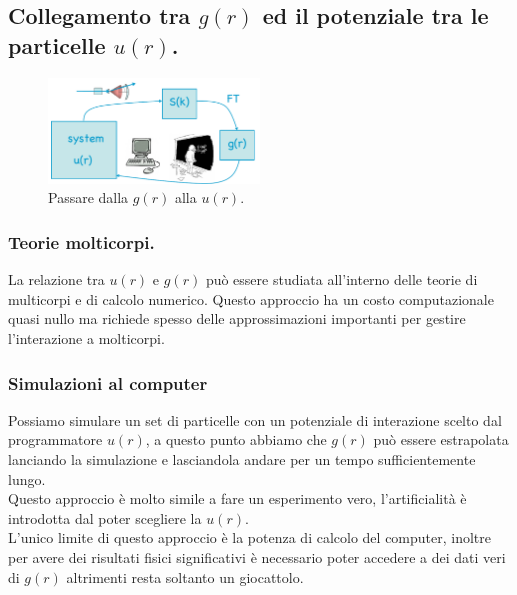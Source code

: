 \subsection{Collegamento tra $g(r)$ ed il potenziale tra le particelle $u(r)$.}
\label{subsec:Collegamento tra $g(r)$ ed il potenziale tra le particelle $u(r)$.}
\begin{figure}[H]
	\centering
	\includegraphics[width=0.5\textwidth]{figures/schema-iniziale-ur-gr.png}
	\caption{Passare dalla $g(r)$ alla $u(r)$.}
	\label{fig:ur-gr}
\end{figure}
\subsubsection{Teorie molticorpi.}
\label{subsubsec:Teorie molticorpi.}
La relazione tra $u(r)$ e $g(r)$ può essere studiata all'interno delle teorie di multicorpi e di calcolo numerico. Questo approccio ha un costo computazionale quasi nullo ma richiede spesso delle approssimazioni importanti per gestire l'interazione a molticorpi.\\
\subsubsection{Simulazioni al computer}
\label{subsubsec:Simulazioni al computer}
Possiamo simulare un set di particelle con un potenziale di interazione scelto dal programmatore $u(r)$, a questo punto abbiamo che $g(r)$ può essere estrapolata lanciando la simulazione e lasciandola andare per un tempo sufficientemente lungo.\\
Questo approccio è molto simile a fare un esperimento vero, l'artificialità è introdotta dal poter scegliere la $u(r)$. \\
L'unico limite di questo approccio è la potenza di calcolo del computer, inoltre per avere dei risultati fisici significativi è necessario poter accedere a dei dati veri di $g(r)$ altrimenti resta soltanto un giocattolo.
